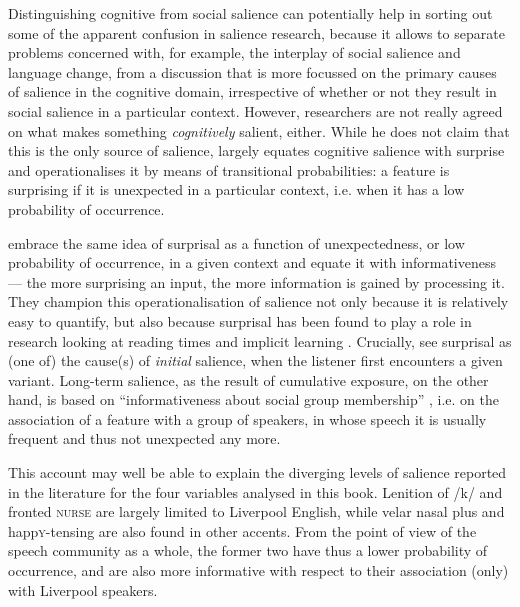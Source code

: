 Distinguishing cognitive from social salience can potentially help in sorting out some of the apparent confusion in salience research, because it allows to separate problems concerned with, for example, the interplay of social salience and language change, from a discussion that is more focussed on the primary causes of salience in the cognitive domain, irrespective of whether or not they result in social salience in a particular context.
However, researchers are not really agreed on what makes something \emph{cognitively} salient, either.
While he does not claim that this is the only source of salience, \textcite[cf.][9]{racz2013} largely equates cognitive salience with surprise and operationalises it by means of transitional probabilities: a feature is surprising if it is unexpected in a particular context, i.e. when it has a low probability of occurrence.

\textcite[cf.][37]{jaegeretal2017} embrace the same idea of surprisal as a function of unexpectedness, or low probability of occurrence, in a given context and equate it with informativeness --- the more surprising an input, the more information is gained by processing it.
They champion this operationalisation of salience not only because it is relatively easy to quantify, but also because surprisal has been found to play a role in research looking at reading times and implicit learning \parencite[cf.][37]{jaegeretal2017}.
Crucially, \citeauthor{jaegeretal2017} see surprisal as (one of) the cause(s) of \emph{initial} salience, when the listener first encounters a given variant.
Long-term salience, as the result of cumulative exposure, on the other hand, is based on \enquote{informativeness about social group membership} \parencite[38]{jaegeretal2017}, i.e. on the association of a feature with a group of speakers, in whose speech it is usually frequent and thus not unexpected any more.

This account may well be able to explain the diverging levels of salience reported in the literature for the four variables analysed in this book.
Lenition of /k/ and fronted \textsc{nurse} are largely limited to Liverpool English, while velar nasal plus and happ\textsc{y}-tensing are also found in other accents.
From the point of view of the speech community as a whole, the former two have thus a lower probability of occurrence, and are also more informative with respect to their association (only) with Liverpool speakers.

